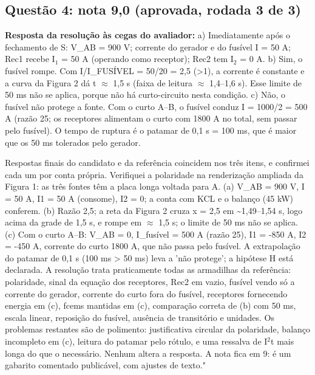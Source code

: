 \documentclass{article}%
\begin{document}
\subsection*{Questão 4: nota 9,0 (aprovada, rodada 3 de 3)}%
\textbf{Resposta da resolução às cegas do avaliador:} a) Imediatamente após o fechamento de S: V\_AB = 900 V; corrente do gerador e do fusível I = 50 A; Rec1 recebe I$_{1}$ = 50 A (operando como receptor); Rec2 tem I$_{2}$ = 0 A.\newline%
\newline%
b) Sim, o fusível rompe. Com I/I\_FUSÍVEL = 50/20 = 2,5 (>1), a corrente é constante e a curva da Figura 2 dá t $\approx$ 1,5 s (faixa de leitura $\approx$ 1,4--1,6 s). Esse limite de 50 ms não se aplica, porque não há curto{-}circuito nesta condição.\newline%
\newline%
c) Não, o fusível não protege a fonte. Com o curto A--B, o fusível conduz I = 1000/2 = 500 A (razão 25; os receptores alimentam o curto com 1800 A no total, sem passar pelo fusível). O tempo de ruptura é o patamar de 0,1 s = 100 ms, que é maior que os 50 ms tolerados pelo gerador.\par %
Respostas finais do candidato e da referência coincidem nos três itens, e confirmei cada um por conta própria. Verifiquei a polaridade na renderização ampliada da Figura 1: as três fontes têm a placa longa voltada para A. (a) V\_AB = 900 V, I = 50 A, I1 = 50 A (consome), I2 = 0; a conta com KCL e o balanço (45 kW) conferem. (b) Razão 2,5; a reta da Figura 2 cruza x = 2,5 em \textasciitilde{}1,49--1,54 s, logo acima da grade de 1,5 s, e rompe em $\approx$ 1,5 s; o limite de 50 ms não se aplica. (c) Com o curto A--B: V\_AB = 0, I\_fusível = 500 A (razão 25), I1 = -850 A, I2 = -450 A, corrente do curto 1800 A, que não passa pelo fusível. A extrapolação do patamar de 0,1 s (100 ms > 50 ms) leva a 'não protege'; a hipótese H está declarada. A resolução trata praticamente todas as armadilhas da referência: polaridade, sinal da equação dos receptores, Rec2 em vazio, fusível vendo só a corrente do gerador, corrente do curto fora do fusível, receptores fornecendo energia em (c), fcems mantidas em (c), comparação correta de (b) com 50 ms, escala linear, reposição do fusível, ausência de transitório e unidades. Os problemas restantes são de polimento: justificativa circular da polaridade, balanço incompleto em (c), leitura do patamar pelo rótulo, e uma ressalva de I$^2$t mais longa do que o necessário. Nenhum altera a resposta. A nota fica em 9: é um gabarito comentado publicável, com ajustes de texto."%
\end{document}
